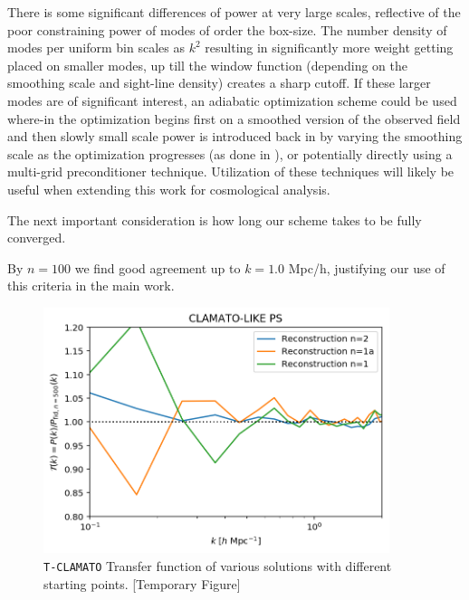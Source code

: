 \documentclass[usenatbib,onecolumn]{mnras}
\begin{document}
There is some significant differences of power at very large scales, reflective of the poor constraining power of modes of order the box-size. The number density of modes per uniform bin scales as $k^2$ resulting in significantly more weight getting placed on smaller modes, up till the window function (depending on the smoothing scale and sight-line density) creates a sharp cutoff. If these larger modes are of significant interest, an adiabatic optimization scheme could be used where-in the optimization begins first on a smoothed version of the observed field and then slowly small scale power is introduced back in by varying the smoothing scale as the optimization progresses (as done in \cite{2018fengseljakzaldarriaga}), or potentially directly using a multi-grid preconditioner technique.\cite{2007multigrid} Utilization of these techniques will likely be useful when extending this work for cosmological analysis.

The next important consideration is how long our scheme takes to be fully converged.

By $n=100$ we find good agreement up to $k = 1.0$ Mpc/h, justifying our use of this criteria in the main work.


\begin{figure}
  \centering  \includegraphics[trim=0cm 0cm 0cm 0cm,width=0.90\textwidth]{./appendix_figures/different_starts.png}
    \caption{\texttt{T-CLAMATO} Transfer function of various solutions with different starting points. [Temporary Figure]} 
    \label{appfig_startingpoints}
\end{figure}
\end{document}
